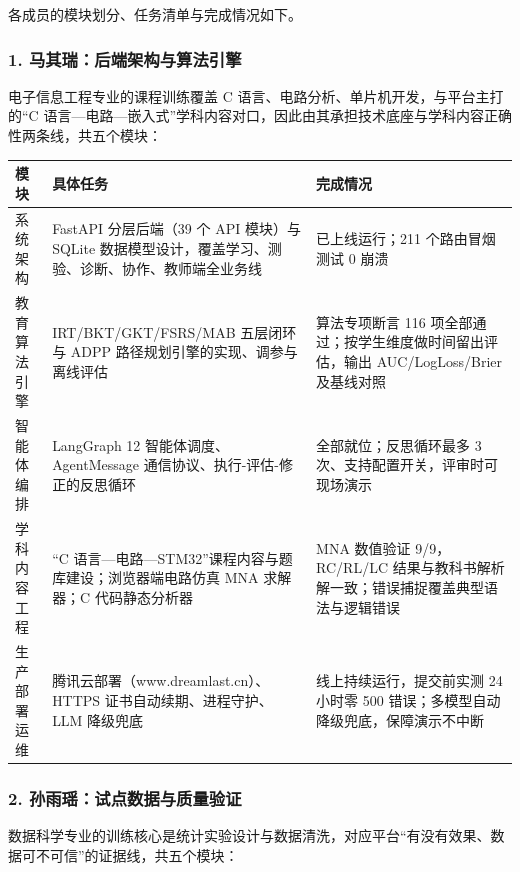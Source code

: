 \documentclass[zihao=-4,a4paper,UTF8,fontset=windows]{ctexart}
\begin{document}
各成员的模块划分、任务清单与完成情况如下。

\subsubsection{1. 马其瑞：后端架构与算法引擎}


电子信息工程专业的课程训练覆盖 C 语言、电路分析、单片机开发，与平台主打的“C 语言—电路—嵌入式”学科内容对口，因此由其承担技术底座与学科内容正确性两条线，共五个模块：

\par\noindent\begin{tabular}{|p{3.0cm}|p{4.5cm}|p{6.2cm}|}
\hline
\textbf{模块} & \textbf{具体任务} & \textbf{完成情况} \\ \hline
系统架构 & FastAPI 分层后端（39 个 API 模块）与 SQLite 数据模型设计，覆盖学习、测验、诊断、协作、教师端全业务线 & 已上线运行；211 个路由冒烟测试 0 崩溃 \\ \hline
教育算法引擎 & IRT/BKT/GKT/FSRS/MAB 五层闭环与 ADPP 路径规划引擎的实现、调参与离线评估 & 算法专项断言 116 项全部通过；按学生维度做时间留出评估，输出 AUC/LogLoss/Brier 及基线对照 \\ \hline
智能体编排 & LangGraph 12 智能体调度、AgentMessage 通信协议、执行-评估-修正的反思循环 & 全部就位；反思循环最多 3 次、支持配置开关，评审时可现场演示 \\ \hline
学科内容工程 & “C 语言—电路—STM32”课程内容与题库建设；浏览器端电路仿真 MNA 求解器；C 代码静态分析器 & MNA 数值验证 9/9，RC/RL/LC 结果与教科书解析解一致；错误捕捉覆盖典型语法与逻辑错误 \\ \hline
生产部署运维 & 腾讯云部署（www.dreamlast.cn）、HTTPS 证书自动续期、进程守护、LLM 降级兜底 & 线上持续运行，提交前实测 24 小时零 500 错误；多模型自动降级兜底，保障演示不中断 \\ \hline
\end{tabular}\par
\subsubsection{2. 孙雨瑶：试点数据与质量验证}


数据科学专业的训练核心是统计实验设计与数据清洗，对应平台“有没有效果、数据可不可信”的证据线，共五个模块：
\end{document}
